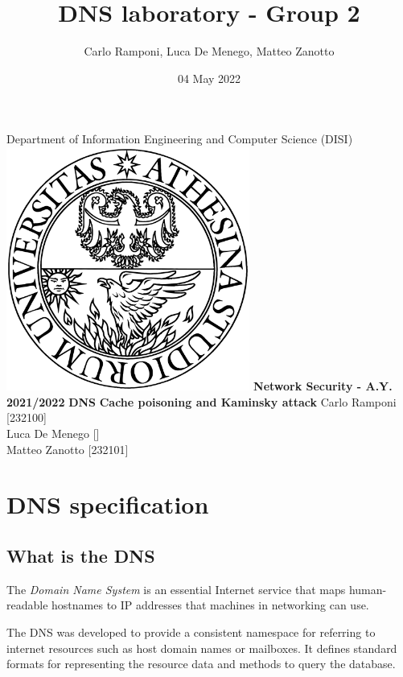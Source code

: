 \documentclass[11pt,a4paper]{article}
\title{DNS laboratory - Group 2}
\author{Carlo Ramponi, Luca De Menego, Matteo Zanotto}
\date{04 May 2022}
\begin{document}
\begin{titlepage}

\centering
    \vfill
    \vskip3cm
    \Large Department of Information Engineering and Computer Science
    \vskip0.5cm
    \Large (DISI)
    \vskip2cm
    \includegraphics[width=8cm]{logo_unitn.png}
    \vskip2cm
    \textbf{\Large Network Security - A.Y. 2021/2022}
    \vskip2cm
    \textbf{\LARGE DNS}
    \vskip0.2cm
    \textbf{\LARGE Cache poisoning and Kaminsky attack}
    \vskip3cm
    \Large Carlo Ramponi [232100]\\Luca De Menego []\\Matteo Zanotto [232101]
    \vfill

\end{titlepage}

\clearpage

\tableofcontents

\clearpage

\section{DNS specification}

\subsection{What is the DNS}

The \emph{Domain Name System} is an essential Internet service that maps human-readable hostnames to IP addresses that machines in networking can use.

\noindent
The DNS was developed to provide a consistent namespace for referring to internet resources such as host domain names or mailboxes. It defines standard formats for representing the resource data and methods to query the database.
\end{document}
